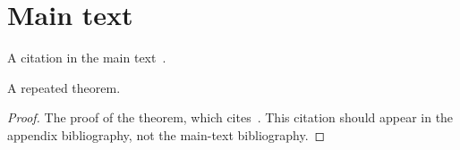 \documentclass{article}
\date{}
\begin{document}
\section{Main text}

A citation in the main text~\cite{lamport86}.

\begin{theoremrep}\label{thm:1}
A repeated theorem.
\end{theoremrep}
\begin{proof}
The proof of the theorem, which cites~\cite{proofsAreHard}. This
citation should appear in the appendix bibliography, not the
main-text bibliography.
\end{proof}

\printbibliography
\end{document}
